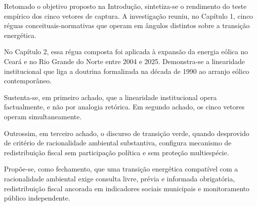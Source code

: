
Retomado o objetivo proposto na Introdução, sintetiza-se o rendimento do teste empírico dos cinco vetores de captura. A investigação reuniu, no Capítulo 1, cinco réguas conceituais-normativas que operam em ângulos distintos sobre a transição energética.

No Capítulo 2, essa régua composta foi aplicada à expansão da energia eólica no Ceará e no Rio Grande do Norte entre 2004 e 2025. Demonstra-se a linearidade institucional que liga a doutrina formalizada na década de 1990 ao arranjo eólico contemporâneo.

Sustenta-se, em primeiro achado, que a linearidade institucional opera factualmente, e não por analogia retórica. Em segundo achado, os cinco vetores operam simultaneamente.

Outrossim, em terceiro achado, o discurso de transição verde, quando desprovido de critério de racionalidade ambiental substantiva, configura mecanismo de redistribuição fiscal sem participação política e sem proteção multiespécie.

Propõe-se, como fechamento, que uma transição energética compatível com a racionalidade ambiental exige consulta livre, prévia e informada obrigatória, redistribuição fiscal ancorada em indicadores sociais municipais e monitoramento público independente.
